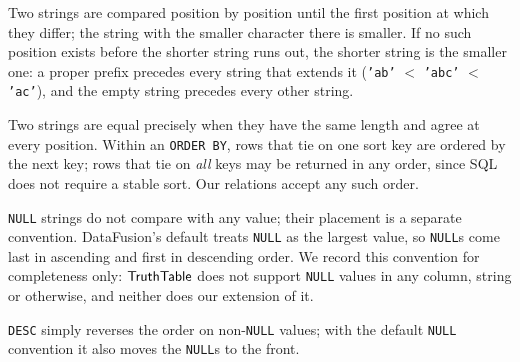 Two strings are compared position by position until the first position at which they differ; the string with the smaller character there is smaller. If no such position exists before the shorter string runs out, the shorter string is the smaller one: a proper prefix precedes every string that extends it (\texttt{'ab'} $<$ \texttt{'abc'} $<$ \texttt{'ac'}), and the empty string precedes every other string.

Two strings are equal precisely when they have the same length and agree at every position. Within an \texttt{ORDER BY}, rows that tie on one sort key are ordered by the next key; rows that tie on \emph{all} keys may be returned in any order, since SQL does not require a stable sort. Our relations accept any such order.

\texttt{NULL} strings do not compare with any value; their placement is a separate convention. DataFusion's default treats \texttt{NULL} as the largest value, so \texttt{NULL}s come last in ascending and first in descending order. We record this convention for completeness only: $\mathsf{TruthTable}$ does not support \texttt{NULL} values in any column, string or otherwise, and neither does our extension of it.

\texttt{DESC} simply reverses the order on non-\texttt{NULL} values; with the default \texttt{NULL} convention it also moves the \texttt{NULL}s to the front.

